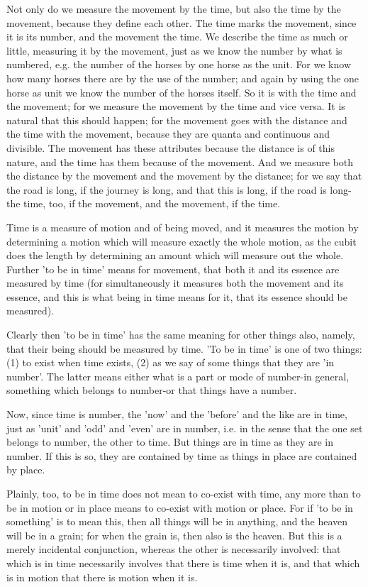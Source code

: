 Not only do we measure the movement by the time, but also the time
by the movement, because they define each other. The time marks the
movement, since it is its number, and the movement the time. We describe
the time as much or little, measuring it by the movement, just as
we know the number by what is numbered, e.g. the number of the horses
by one horse as the unit. For we know how many horses there are by
the use of the number; and again by using the one horse as unit we
know the number of the horses itself. So it is with the time and the
movement; for we measure the movement by the time and vice versa.
It is natural that this should happen; for the movement goes with
the distance and the time with the movement, because they are quanta
and continuous and divisible. The movement has these attributes because
the distance is of this nature, and the time has them because of the
movement. And we measure both the distance by the movement and the
movement by the distance; for we say that the road is long, if the
journey is long, and that this is long, if the road is long-the time,
too, if the movement, and the movement, if the time. 

Time is a measure of motion and of being moved, and it measures the
motion by determining a motion which will measure exactly the whole
motion, as the cubit does the length by determining an amount which
will measure out the whole. Further 'to be in time' means for movement,
that both it and its essence are measured by time (for simultaneously
it measures both the movement and its essence, and this is what being
in time means for it, that its essence should be measured).

Clearly then 'to be in time' has the same meaning for other things
also, namely, that their being should be measured by time. 'To be
in time' is one of two things: (1) to exist when time exists, (2)
as we say of some things that they are 'in number'. The latter means
either what is a part or mode of number-in general, something which
belongs to number-or that things have a number. 

Now, since time is number, the 'now' and the 'before' and the like
are in time, just as 'unit' and 'odd' and 'even' are in number, i.e.
in the sense that the one set belongs to number, the other to time.
But things are in time as they are in number. If this is so, they
are contained by time as things in place are contained by place.

Plainly, too, to be in time does not mean to co-exist with time, any
more than to be in motion or in place means to co-exist with motion
or place. For if 'to be in something' is to mean this, then all things
will be in anything, and the heaven will be in a grain; for when the
grain is, then also is the heaven. But this is a merely incidental
conjunction, whereas the other is necessarily involved: that which
is in time necessarily involves that there is time when it is, and
that which is in motion that there is motion when it is.

